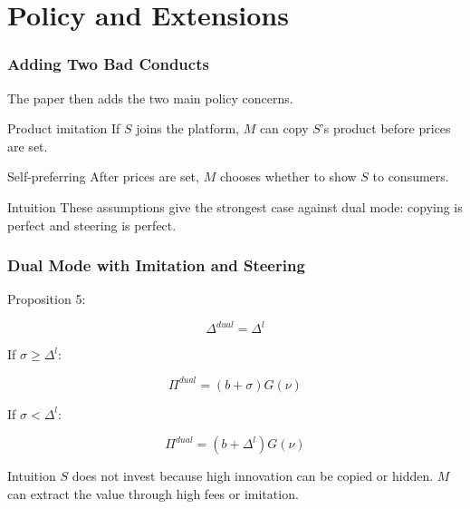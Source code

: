 ﻿\section{Policy and Extensions}

\begin{frame}
  \frametitle{Adding Two Bad Conducts}
  \small
  The paper then adds the two main policy concerns.

  \begin{block}{Product imitation}
    If $S$ joins the platform, $M$ can copy $S$'s product before prices are set.
  \end{block}

  \begin{block}{Self-preferring}
    After prices are set, $M$ chooses whether to show $S$ to consumers.
  \end{block}

  \begin{alertblock}{Intuition}
    These assumptions give the strongest case against dual mode: copying is perfect and steering is perfect.
  \end{alertblock}
\end{frame}

\begin{frame}
  \frametitle{Dual Mode with Imitation and Steering}
  \small
  Proposition 5:

  \begin{equation*}
    \Delta^{dual}=\Delta^l
  \end{equation*}

  If $\sigma\geq\Delta^l$:

  \begin{equation*}
    \Pi^{dual}=(b+\sigma)G(\nu)
  \end{equation*}

  If $\sigma<\Delta^l$:

  \begin{equation*}
    \Pi^{dual}=(b+\Delta^l)G(\nu)
  \end{equation*}

  \begin{block}{Intuition}
    $S$ does not invest because high innovation can be copied or hidden. $M$ can extract the value through high fees or imitation.
  \end{block}
\end{frame}

